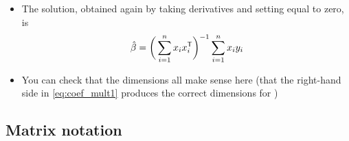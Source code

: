 \documentclass{article}
\begin{document}
\begin{itemize}
\item The solution, obtained again by taking derivatives and setting equal to
  zero, is
  \begin{equation}
  \label{eq:coef_mult1}
  \hat{\beta} = \bigg( \sum_{i=1}^n x_i x_i^{\mathsf{T}} \bigg)^{-1} \sum_{i=1}^n x_i y_i  
  \end{equation}

\item You can check that the dimensions all make sense here (that the right-hand
  side in \eqref{eq:coef_mult1} produces the correct dimensions for
  \smash{$\hbeta$}) 
\end{itemize}

\subsection{Matrix notation}
\end{document}
